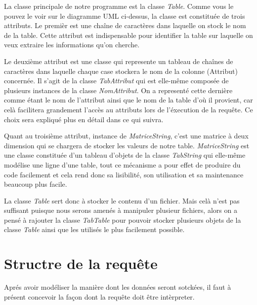 \documentclass[oneside,13pt,a4paper]{report}
\begin{document}
La classe principale de notre programme est la classe \textit{Table}. 
Comme vous le pouvez le voir sur le diagramme UML ci-dessus, 
la classe est constituée de trois attributs. Le premièr est une chaîne de caractères dans laquelle on stock le nom de la table. 
Cette attribut est indispensable pour identifier la table sur laquelle on veux extraire les informations qu’on cherche.


Le deuxième attribut est une classe qui represente un tableau de chaînes de caractères dans laquelle chaque case stockera le nom de la colonne (Attribut) concernée. 
Il s'agit de la classe \textit{TabAttribut} qui est elle-même composée de plusieurs instances de la classe \textit{NomAttribut}.
On a representé cette dernière comme étant le nom de l'attribut ainsi que le nom de la table d'où il provient, 
car celà facilitera grandement l'accès au attributs lors de l'éxecution de la requête. Ce choix sera expliqué plus en détail dans ce qui suivra.

Quant au troisième attribut, instance de \textit{MatriceString}, c’est une matrice à deux dimension qui se chargera de stocker les valeurs de notre table.
\textit{MatriceString} est une classe constituée d'un tableau d'objets de la classe \textit{TabString} qui elle-même modélise une ligne d'une table, tout ce mécanisme a pour effet de produire du code facilement et cela rend donc sa lisibilité, son utilisation et sa maintenance beaucoup plus facile.

La classe \textit{Table} sert donc à stocker le contenu d'un fichier. Mais celà n'est pas suffisant puisque nous serons amenés à manipuler plusieur fichiers, alors on a pensé à rajouter 
la classe \textit{TabTable} pour pouvoir stocker plusieurs objets de la classe \textit{Table} ainsi que les utilisés le plus facilement possible.

\section{Structre de la requête}

Aprés avoir modéliser la manière dont les données seront sotckées, il faut à présent concevoir la façon dont la requête doit être intèrpreter.
\end{document}
